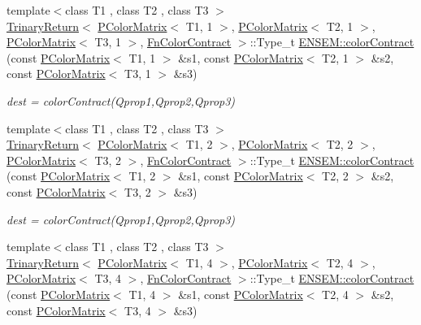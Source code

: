 \begin{DoxyCompactItemize}
{\footnotesize template$<$class T1 , class T2 , class T3 $>$ }\\\mbox{\hyperlink{structENSEM_1_1TrinaryReturn}{Trinary\+Return}}$<$ \mbox{\hyperlink{classENSEM_1_1PColorMatrix}{P\+Color\+Matrix}}$<$ T1, 1 $>$, \mbox{\hyperlink{classENSEM_1_1PColorMatrix}{P\+Color\+Matrix}}$<$ T2, 1 $>$, \mbox{\hyperlink{classENSEM_1_1PColorMatrix}{P\+Color\+Matrix}}$<$ T3, 1 $>$, \mbox{\hyperlink{structENSEM_1_1FnColorContract}{Fn\+Color\+Contract}} $>$\+::Type\+\_\+t \mbox{\hyperlink{group__primcolormatrix_ga89c3eb4b75063bbb9022ef9b699765dd}{E\+N\+S\+E\+M\+::color\+Contract}} (const \mbox{\hyperlink{classENSEM_1_1PColorMatrix}{P\+Color\+Matrix}}$<$ T1, 1 $>$ \&s1, const \mbox{\hyperlink{classENSEM_1_1PColorMatrix}{P\+Color\+Matrix}}$<$ T2, 1 $>$ \&s2, const \mbox{\hyperlink{classENSEM_1_1PColorMatrix}{P\+Color\+Matrix}}$<$ T3, 1 $>$ \&s3)
\begin{DoxyCompactList}\small\item\em dest = color\+Contract(\+Qprop1,\+Qprop2,\+Qprop3) \end{DoxyCompactList}\item 
{\footnotesize template$<$class T1 , class T2 , class T3 $>$ }\\\mbox{\hyperlink{structENSEM_1_1TrinaryReturn}{Trinary\+Return}}$<$ \mbox{\hyperlink{classENSEM_1_1PColorMatrix}{P\+Color\+Matrix}}$<$ T1, 2 $>$, \mbox{\hyperlink{classENSEM_1_1PColorMatrix}{P\+Color\+Matrix}}$<$ T2, 2 $>$, \mbox{\hyperlink{classENSEM_1_1PColorMatrix}{P\+Color\+Matrix}}$<$ T3, 2 $>$, \mbox{\hyperlink{structENSEM_1_1FnColorContract}{Fn\+Color\+Contract}} $>$\+::Type\+\_\+t \mbox{\hyperlink{group__primcolormatrix_gacaff55b3cd1b6aafb43249af3ac16ea9}{E\+N\+S\+E\+M\+::color\+Contract}} (const \mbox{\hyperlink{classENSEM_1_1PColorMatrix}{P\+Color\+Matrix}}$<$ T1, 2 $>$ \&s1, const \mbox{\hyperlink{classENSEM_1_1PColorMatrix}{P\+Color\+Matrix}}$<$ T2, 2 $>$ \&s2, const \mbox{\hyperlink{classENSEM_1_1PColorMatrix}{P\+Color\+Matrix}}$<$ T3, 2 $>$ \&s3)
\begin{DoxyCompactList}\small\item\em dest = color\+Contract(\+Qprop1,\+Qprop2,\+Qprop3) \end{DoxyCompactList}\item 
{\footnotesize template$<$class T1 , class T2 , class T3 $>$ }\\\mbox{\hyperlink{structENSEM_1_1TrinaryReturn}{Trinary\+Return}}$<$ \mbox{\hyperlink{classENSEM_1_1PColorMatrix}{P\+Color\+Matrix}}$<$ T1, 4 $>$, \mbox{\hyperlink{classENSEM_1_1PColorMatrix}{P\+Color\+Matrix}}$<$ T2, 4 $>$, \mbox{\hyperlink{classENSEM_1_1PColorMatrix}{P\+Color\+Matrix}}$<$ T3, 4 $>$, \mbox{\hyperlink{structENSEM_1_1FnColorContract}{Fn\+Color\+Contract}} $>$\+::Type\+\_\+t \mbox{\hyperlink{group__primcolormatrix_ga2cd5ca8c1ac1d4fbf5c4d27665ccb996}{E\+N\+S\+E\+M\+::color\+Contract}} (const \mbox{\hyperlink{classENSEM_1_1PColorMatrix}{P\+Color\+Matrix}}$<$ T1, 4 $>$ \&s1, const \mbox{\hyperlink{classENSEM_1_1PColorMatrix}{P\+Color\+Matrix}}$<$ T2, 4 $>$ \&s2, const \mbox{\hyperlink{classENSEM_1_1PColorMatrix}{P\+Color\+Matrix}}$<$ T3, 4 $>$ \&s3)

\end{DoxyCompactItemize}
